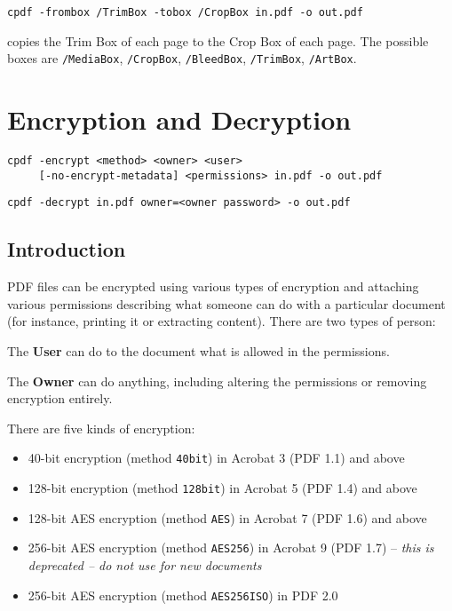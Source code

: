 \documentclass{book}
\begin{document}
  \begin{framed}
    \small\verb!cpdf -frombox /TrimBox -tobox /CropBox in.pdf -o out.pdf!
  \end{framed}
  \noindent copies the Trim Box of each page to the Crop Box of each page. The possible boxes are \texttt{/MediaBox}, \texttt{/CropBox}, \texttt{/BleedBox}, \texttt{/TrimBox}, \texttt{/ArtBox}.\pagestyle{empty}\thispagestyle{fancy}

\chapter{Encryption and Decryption}
\pagestyle{fancy}
\label{encryption}
  \begin{framed}
    \small\noindent\verb!cpdf -encrypt <method> <owner> <user>!\\
    \noindent\verb!     [-no-encrypt-metadata] <permissions> in.pdf -o out.pdf!

    \vspace{1.5mm}
    \noindent\verb!cpdf -decrypt in.pdf owner=<owner password> -o out.pdf!
  \end{framed}
  \label{crypt}
  \section{Introduction}
  PDF files can be encrypted using various types of encryption and attaching
various permissions describing what someone can do with a particular document
(for instance, printing it or extracting content). There are two types of
person:
  \begin{description}
    \item The \textbf{User} can do to the document what is allowed in the permissions.
    \item The \textbf{Owner} can do anything, including altering the permissions or removing encryption entirely.
  \end{description}
  There are five kinds of encryption:
  \begin{itemize}
  \item 40-bit encryption (method \texttt{40bit}) in Acrobat 3 (PDF 1.1) and above
  \item 128-bit encryption (method \texttt{128bit}) in Acrobat 5 (PDF 1.4) and above
  \item 128-bit AES encryption (method \texttt{AES}) in Acrobat 7 (PDF 1.6) and above
  \item 256-bit AES encryption (method \texttt{AES256}) in Acrobat 9 (PDF 1.7) -- \textit{this is deprecated -- do not use for new documents}
  \item 256-bit AES encryption (method \texttt{AES256ISO}) in PDF 2.0
  \end{itemize}
\end{document}

